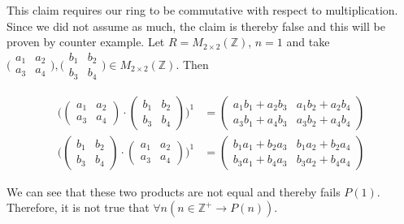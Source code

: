 \documentclass[12pt, a4paper]{article}
\begin{document}
\begin{addmargin}[2.8em]{2.8em}

    \noindent This claim requires our ring to be commutative with respect to multiplication. Since we did not assume as much, the claim is thereby false and this will be proven by counter example. Let $R=M_{2\times 2}(\mathbb{Z})$, $n=1$ and take
    $\bigl( \begin{smallmatrix} a_1&a_2\\ a_3&a_4 \end{smallmatrix} \bigr),\bigl( \begin{smallmatrix} b_1&b_2\\ b_3&b_4 \end{smallmatrix} \bigr)\in M_{2\times 2}(\mathbb{Z})$. Then
    
    \begin{equation*}
        \begin{split}
            \Bigg(\left(\begin{array}{cc} a_1 & a_2 \\ a_3 & a_4 \end{array} \right )\cdot\left(\begin{array}{cc} b_1 & b_2 \\ b_3 & b_4 \end{array} \right )\Bigg)^1& =\left(\begin{array}{cc} a_1b_1+a_2b_3 & a_1b_2+a_2b_4 \\ a_3b_1+a_4b_3 & a_3b_2+a_4b_4 \end{array} \right ) \\
            \Bigg(\left(\begin{array}{cc} b_1 & b_2 \\ b_3 & b_4 \end{array} \right )\cdot\left(\begin{array}{cc} a_1 & a_2 \\ a_3 & a_4 \end{array} \right )\Bigg)^1& =\left(\begin{array}{cc} b_1a_1+b_2a_3 & b_1a_2+b_2a_4 \\ b_3a_1+b_4a_3 & b_3a_2+b_4a_4 \end{array} \right )
        \end{split}
    \end{equation*}
    
    \newpage
    
    \noindent We can see that these two products are not equal and thereby fails $P(1)$. Therefore, it is not true that $\forall n(n\in\mathbb{Z}^+\rightarrow P(n))$.

\end{addmargin}
  
\end{document}
